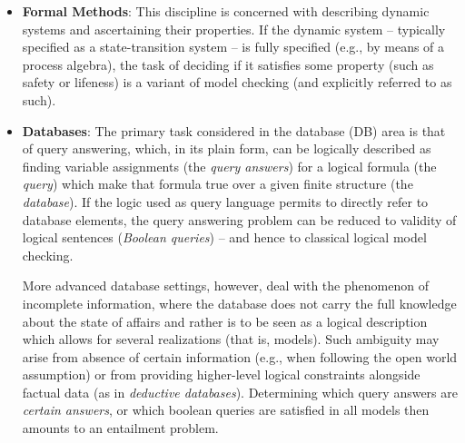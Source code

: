 \documentclass[10pt,a4paper]{amsart}
\theoremstyle{definition}
\numberwithin{equation}{section}
\theoremstyle{plain}
\theoremstyle{definition}
\theoremstyle{myexample}
\theoremstyle{plain}
\theoremstyle{definition}
\begin{document}
\begin{itemize}
\item \textbf{Formal Methods}: This discipline is concerned with describing dynamic systems and ascertaining their properties. If the dynamic system -- typically specified as a state-transition system -- is fully specified (e.g., by means of a process algebra), the task of deciding if it satisfies some property (such as safety or lifeness) is a variant of model checking (and explicitly referred to as such).  
\item \textbf{Databases}: The primary task considered in the database (DB) area is that of query answering, which, in its plain form, can be logically described as finding variable assignments (the \emph{query answers}) for a logical formula (the \emph{query}) which make that formula true over a given finite structure (the \emph{database}). 
If the logic used as query language permits to directly refer to database elements, the query answering problem can be reduced to validity of logical sentences (\emph{Boolean queries}) -- and hence to classical logical model checking.

More advanced database settings, however, deal with the phenomenon of incomplete information, where the database does not carry the full knowledge about the state of affairs and rather is to be seen as a logical description which allows for several realizations (that is, models). Such ambiguity may arise from absence of certain information (e.g., when following the open world assumption) or from providing higher-level logical constraints alongside factual data (as in \emph{deductive databases}).  
Determining which query answers are \emph{certain answers}, or which boolean queries are satisfied in all models then amounts to an entailment problem.             


\end{itemize}
\end{document}
